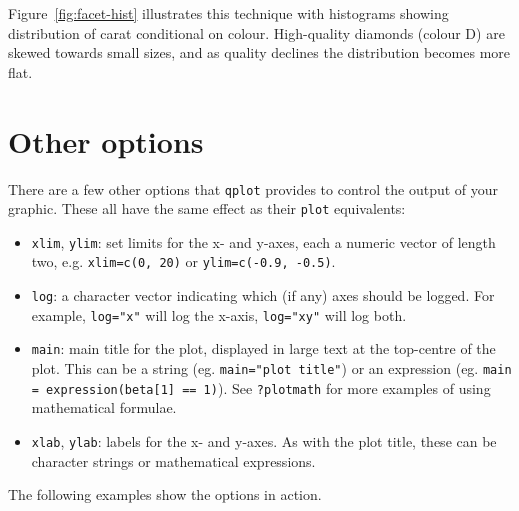 Figure~\ref{fig:facet-hist} illustrates this technique with histograms showing distribution of carat conditional on colour.  High-quality diamonds (colour D) are skewed towards small sizes, and as quality declines the distribution becomes more flat.  

% 


\section{Other options}\label{sec:other_options}

There are a few other options that {\tt qplot} provides to control the output of your graphic.  These all have the same effect as their {\tt plot} equivalents:

\begin{itemize}
	\item {\tt xlim}, {\tt ylim}: set limits for the x- and y-axes, each a numeric vector of length two, e.g. {\tt xlim=c(0, 20)} or {\tt ylim=c(-0.9, -0.5)}.
	\item {\tt log}: a character vector indicating which (if any) axes should be logged.  For example, {\tt log="x"} will log the x-axis, {\tt log="xy"} will log both.
	\item {\tt main}: main title for the plot, displayed in large text at the top-centre of the plot.  This can be a string (eg. {\tt main="plot title"}) or an expression (eg. {\tt main = expression(beta[1] == 1)}).  See {\tt ?plotmath} for more examples of using mathematical formulae.
	\item {\tt xlab}, {\tt ylab}: labels for the x- and y-axes.  As with the plot title, these can be character strings or mathematical expressions.
\end{itemize}

The following examples show the options in action.

